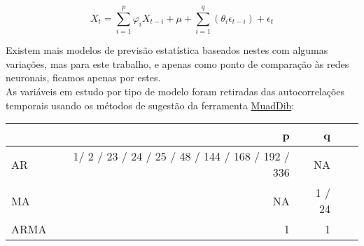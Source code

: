 \begin{equation} \label{eq:ma} 
    X_{t} = \sum_{i=1}^{p}\varphi_{i} X_{t-i}  + \mu + \sum_{i=1}^{q}(\theta_{i} \epsilon_{t-i}) + \epsilon_{t}
\end{equation}
\smallskip

Existem mais modelos de previsão estatística baseados nestes com algumas variações, mas para este trabalho, e apenas como ponto de comparação às redes neuronais, ficamos apenas por estes.\\
As variáveis em estudo por tipo de modelo foram retiradas das autocorrelações temporais usando os métodos de sugestão da ferramenta \hyperref[se:muaddib]{MuadDib}:\\


\begin{table}[b] \centering %
\begin{tabular}{lrrrr}
    \toprule
     & p & q \\
    \midrule
    AR & 1/ 2 / 23 / 24 / 25 / 48 / 144 / 168 / 192 / 336 & NA \\
    MA & NA & 1 / 24 \\
    ARMA & 1 & 1 \\
    \bottomrule
    \end{tabular}
\end{table}


